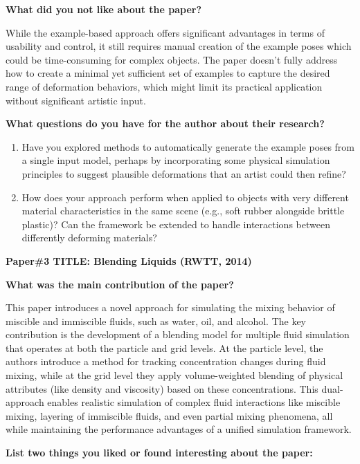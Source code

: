 \documentclass[
]{article}
\begin{document}
\textbf{What did you not like about the paper?}

While the example-based approach offers significant advantages in terms of usability and control, it still requires manual creation of the example poses which could be time-consuming for complex objects. The paper doesn't fully address how to create a minimal yet sufficient set of examples to capture the desired range of deformation behaviors, which might limit its practical application without significant artistic input.

\textbf{What questions do you have for the author about their research?}

\begin{enumerate}
\def\labelenumi{\arabic{enumi}.}
\item
  Have you explored methods to automatically generate the example poses from a single input model, perhaps by incorporating some physical simulation principles to suggest plausible deformations that an artist could then refine?
\item
  How does your approach perform when applied to objects with very different material characteristics in the same scene (e.g., soft rubber alongside brittle plastic)? Can the framework be extended to handle interactions between differently deforming materials?
\end{enumerate}

\newpage
\textbf{Paper\#3 TITLE: Blending Liquids (RWTT, 2014)}

\textbf{What was the main contribution of the paper?}

This paper introduces a novel approach for simulating the mixing behavior of miscible and immiscible fluids, such as water, oil, and alcohol. The key contribution is the development of a blending model for multiple fluid simulation that operates at both the particle and grid levels. At the particle level, the authors introduce a method for tracking concentration changes during fluid mixing, while at the grid level they apply volume-weighted blending of physical attributes (like density and viscosity) based on these concentrations. This dual-approach enables realistic simulation of complex fluid interactions like miscible mixing, layering of immiscible fluids, and even partial mixing phenomena, all while maintaining the performance advantages of a unified simulation framework.

\textbf{List two things you liked or found interesting about the paper:}
\end{document}
